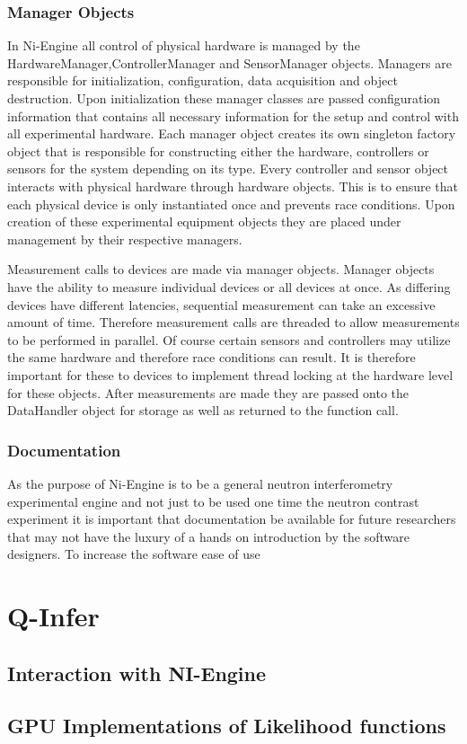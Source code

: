 \subsubsection{Manager Objects}
In Ni-Engine all control of physical hardware is managed by the HardwareManager,ControllerManager and SensorManager objects. Managers are responsible for initialization, configuration, data acquisition and object destruction. Upon initialization these manager classes are passed configuration information that contains all necessary information for the setup and control with all experimental hardware. Each manager object creates its own singleton factory object that is responsible for constructing either the hardware, controllers or sensors for the system depending on its type. Every controller and sensor object interacts with physical hardware through hardware objects. This is to ensure that each physical device is only instantiated once and prevents race conditions. Upon creation of these experimental equipment objects they are placed under management by their respective managers. 

Measurement calls to devices are made via manager objects. Manager objects have the ability to measure individual devices or all devices at once. As differing devices have different latencies, sequential measurement can take an excessive amount of time. Therefore measurement calls are threaded to allow measurements to be performed in parallel. Of course certain sensors and controllers may utilize the same hardware and therefore race conditions can result. It is therefore important for these to devices to implement thread locking at the hardware level for these objects. After measurements are made they are passed onto the DataHandler object for storage as well as returned to the function call. 
\subsubsection{Documentation}
As the purpose of Ni-Engine is to be a general neutron interferometry experimental engine and not just to be used one time the neutron contrast experiment it is important that documentation be available for future researchers that may not have the luxury of a hands on introduction by the software designers. To increase the software ease of use
\section{Q-Infer}
\subsection{Interaction with NI-Engine}
\subsection{GPU Implementations of Likelihood functions}

